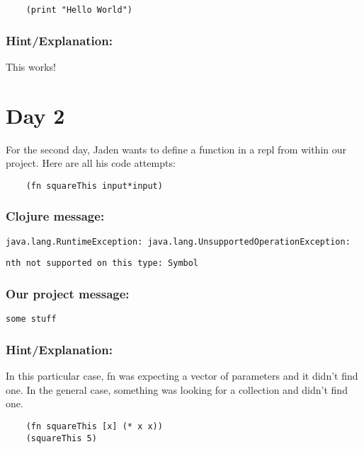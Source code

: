 \documentclass[12pt]{article}
\begin{document}
\begin{verbatim}
	(print "Hello World")
\end{verbatim}

{\addtolength{\leftskip}{10mm}

	\subsubsection*{Hint/Explanation:}
	
	This works!
	
}


\section{Day 2}
For the second day, Jaden wants to define a function in a repl from within our project. Here are all his code attempts:

\begin{verbatim}
	(fn squareThis input*input)
\end{verbatim}

{\addtolength{\leftskip}{10mm}

	\subsubsection*{Clojure message:}
	
	\verb|java.lang.RuntimeException: java.lang.UnsupportedOperationException: |
	
	\verb|nth not supported on this type: Symbol|

	\subsubsection*{Our project message:}
	
	\verb|some stuff|
	
	\subsubsection*{Hint/Explanation:}
In this particular case, fn was expecting a vector of parameters and it didn't find one. In the general case, something was looking for a collection and didn't find one.
	
}

\begin{verbatim}
	(fn squareThis [x] (* x x))
	(squareThis 5)
\end{verbatim}
\end{document}
